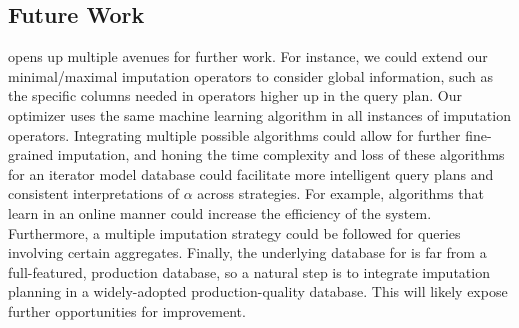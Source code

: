 \subsection{Future Work}
\ProjectName{} opens up multiple avenues for further work. For instance, we
could extend our minimal/maximal imputation operators to consider global
information, such as the specific columns needed in operators higher up in the
query plan.  Our optimizer uses the same machine learning algorithm in all
instances of imputation operators. Integrating multiple possible algorithms
could allow for further fine-grained imputation, and honing the time complexity and
loss of these algorithms for an iterator model database could facilitate more
intelligent query plans and consistent interpretations of $\alpha$ across
strategies. For example, algorithms that learn in an online manner could
increase the efficiency of the system.  Furthermore, a multiple imputation
strategy could be followed for queries involving certain aggregates. Finally,
the underlying database for \ProjectName{} is far from a full-featured,
production database, so a natural step is to integrate imputation planning in a
widely-adopted production-quality database. This will likely expose further
opportunities for improvement.





